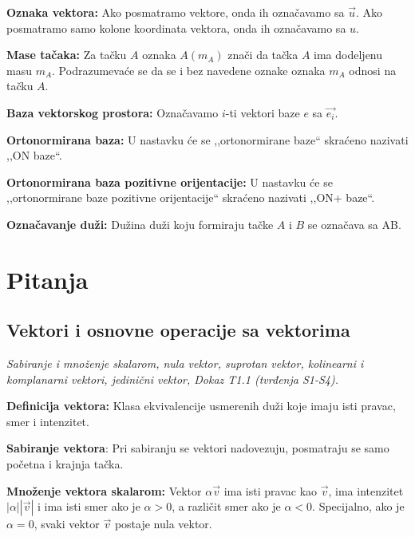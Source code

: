 \documentclass[12pt]{article}
\newcommand{\vek}[1]{\overrightarrow{#1}}
\begin{document}
\textbf{Oznaka vektora:} Ako posmatramo vektore, onda ih označavamo sa
$\vek{u}$. Ako posmatramo samo kolone koordinata vektora, onda ih označavamo sa
$u$.
\par

\textbf{Mase tačaka:} Za tačku $A$ oznaka $A(m_A)$ znači da tačka $A$ ima
dodeljenu masu $m_A$. Podrazumevaće se da se i bez navedene oznake oznaka
$m_{A}$ odnosi na tačku $A$.
\par

\textbf{Baza vektorskog prostora:} Označavamo $i$-ti vektori baze $e$ sa
$\vek{e_i}$.
\par

\textbf{Ortonormirana baza:} U nastavku će se ,,ortonormirane baze`` skraćeno
nazivati ,,ON baze``.
\par

\textbf{Ortonormirana baza pozitivne orijentacije:} U nastavku će se
,,ortonormirane baze pozitivne orijentacije`` skraćeno nazivati ,,ON+ baze``.
\par

\textbf{Označavanje duži:} Dužina duži koju formiraju tačke $A$ i $B$
se označava sa AB.

\newpage

\section{Pitanja}
\subsection{Vektori i osnovne operacije sa vektorima}
\textit{Sabiranje i množenje skalarom, nula vektor, suprotan vektor, kolinearni
    i komplanarni vektori, jedinični vektor, Dokaz T1.1 (tvrđenja S1-S4).}
\par
\vspace*{1cm}

\textbf{Definicija vektora:} Klasa ekvivalencije usmerenih duži koje imaju isti
pravac, smer i intenzitet.
\par

\textbf{Sabiranje vektora}: Pri sabiranju se vektori nadovezuju, posmatraju se
samo početna i krajnja tačka.
\par

\textbf{Množenje vektora skalarom:} Vektor $\alpha\vek{v}$ ima isti pravac
kao $\vek{v}$, ima intenzitet $|\alpha||\vek{v}|$ i ima isti smer ako je
$\alpha>0$, a različit smer ako je $\alpha<0$. Specijalno, ako je $\alpha=0$,
svaki vektor $\vek{v}$ postaje nula vektor.
\par
\end{document}
